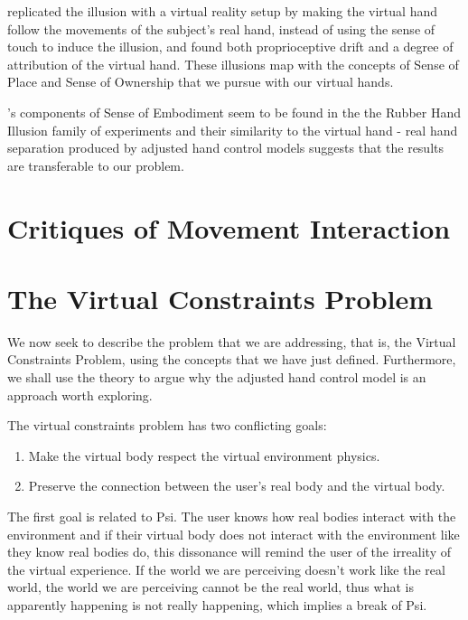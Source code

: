 \parencite{Sanchez-Vives2010} replicated the illusion with a virtual reality setup by making the virtual hand follow the movements of the subject's real hand, instead of using the sense of touch to induce the illusion, and found both proprioceptive drift and a degree of attribution of the virtual hand. These illusions map with the concepts of Sense of Place and Sense of Ownership that we pursue with our virtual hands.

\parencite{Kilteni2012}'s components of Sense of Embodiment seem to be found in the the Rubber Hand Illusion family of experiments and their similarity to the virtual hand - real hand separation produced by adjusted hand control models suggests that the results are transferable to our problem.

\section{Critiques of Movement Interaction}
\label{sec:critiquesMovementInteraction}


\section{The Virtual Constraints Problem}
\label{sec:virtualContraintsProblem}

We now seek to describe the problem that we are addressing, that is, the Virtual Constraints Problem, using the concepts that we have just defined. Furthermore, we shall use the theory to argue why the adjusted hand control model is an approach worth exploring.

The virtual constraints problem has two conflicting goals:

\begin{enumerate}
\item Make the virtual body respect the virtual environment physics.
\item Preserve the connection between the user's real body and the virtual body.
\end{enumerate}

The first goal is related to Psi. The user knows how real bodies interact with the environment and if their virtual body does not interact with the environment like they know real bodies do, this dissonance will remind the user of the irreality of the virtual experience. If the world we are perceiving doesn't work like the real world, the world we are perceiving cannot be the real world, thus what is apparently happening is not really happening, which implies a break of Psi.

